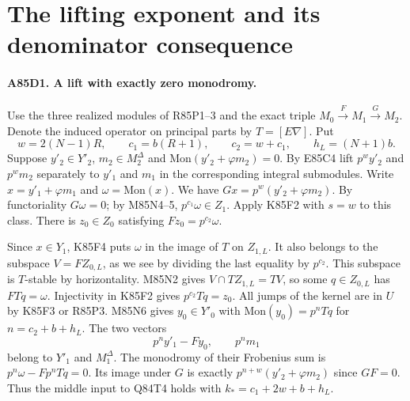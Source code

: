 \section{The lifting exponent and its denominator consequence}

\paragraph{A85D1. A lift with exactly zero monodromy.}
Use the three realized modules of R85P1--3 and the exact triple
$M_0\xrightarrow F M_1\xrightarrow G M_2$. Denote the induced
operator on principal parts by $T=[E\nabla]$. Put
\[
 w=2(N-1)R,\qquad c_1=b(R+1),\qquad c_2=w+c_1,\qquad h_L=(N+1)b .
\]
Suppose $y'_2\in Y'_2$, $m_2\in M_2^\Delta$ and
$\mathrm{Mon}(y'_2+\varphi m_2)=0$. By E85C4 lift
$p^w y'_2$ and $p^w m_2$ separately to $y'_1$ and $m_1$ in
the corresponding integral submodules. Write
$x=y'_1+\varphi m_1$ and $\omega=\mathrm{Mon}(x)$. We have
$Gx=p^w(y'_2+\varphi m_2)$. By functoriality $G\omega=0$;
by M85N4--5, $p^{c_1}\omega\in Z_1$. Apply K85F2 with
$s=w$ to this class. There is $z_0\in Z_0$ satisfying
$Fz_0=p^{c_2}\omega$.

Since $x\in Y_1$, K85F4 puts $\omega$ in the image of $T$ on
$Z_{1,L}$. It also belongs to the subspace $V=F Z_{0,L}$, as
we see by dividing the last equality by $p^{c_2}$. This subspace
is $T$-stable by horizontality. M85N2 gives
$V\cap T Z_{1,L}=T V$, so some $q\in Z_{0,L}$ has
$FTq=\omega$. Injectivity in K85F2 gives $p^{c_2}Tq=z_0$.
All jumps of the kernel are in $U$ by K85F3 or R85P3.
M85N6 gives $y_0\in Y'_0$ with
$\mathrm{Mon}(y_0)=p^n Tq$ for $n=c_2+b+h_L$. The two vectors
\[
            p^n y'_1-Fy_0,\qquad p^n m_1
\]
belong to $Y'_1$ and $M_1^\Delta$. The monodromy of their
Frobenius sum is $p^n\omega-Fp^n Tq=0$. Its image under $G$
is exactly $p^{n+w}(y'_2+\varphi m_2)$ since $GF=0$. Thus the
middle input to Q84T4 holds with $k_*=c_1+2w+b+h_L$.

